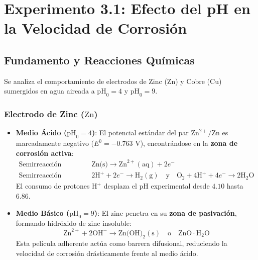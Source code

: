 \documentclass[11pt,a4paper]{article}
\begin{document}
\section{Experimento 3.1: Efecto del pH en la Velocidad de Corrosión}
\subsection{Fundamento y Reacciones Químicas}
Se analiza el comportamiento de electrodos de Zinc ($\text{Zn}$) y Cobre ($\text{Cu}$) sumergidos en agua aireada a $\text{pH}_0 = 4$ y $\text{pH}_0 = 9$.

\subsubsection{Electrodo de Zinc ($\text{Zn}$)}
\begin{itemize}
    \item \textbf{Medio Ácido ($\text{pH}_0 = 4$)}: El potencial estándar del par $\text{Zn}^{2+}/\text{Zn}$ es marcadamente negativo ($E^0 = -0.763\text{ V}$), encontrándose en la \textbf{zona de corrosión activa}:
    \begin{align}
        \text{Semirreacción anódica:} \quad & \text{Zn(s)} \longrightarrow \text{Zn}^{2+}(\text{aq}) + 2e^- \\
        \text{Semirreacción catódica:} \quad & 2\text{H}^+ + 2e^- \longrightarrow \text{H}_2(\text{g}) \quad \text{y} \quad \text{O}_2 + 4\text{H}^+ + 4e^- \longrightarrow 2\text{H}_2\text{O}
    \end{align}
    El consumo de protones $\text{H}^+$ desplaza el pH experimental desde $4.10$ hasta $6.86$.
    \item \textbf{Medio Básico ($\text{pH}_0 = 9$)}: El zinc penetra en su \textbf{zona de pasivación}, formando hidróxido de zinc insoluble:
    \begin{equation}
        \text{Zn}^{2+} + 2\text{OH}^- \longrightarrow \text{Zn(OH)}_2(\text{s}) \quad \text{o} \quad \text{ZnO}\cdot\text{H}_2\text{O}
    \end{equation}
    Esta película adherente actúa como barrera difusional, reduciendo la velocidad de corrosión drásticamente frente al medio ácido.
\end{itemize}
\end{document}
